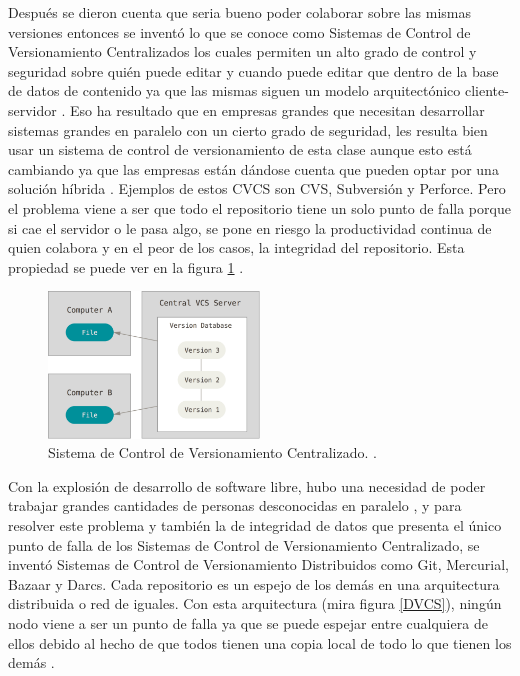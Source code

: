 Después se dieron cuenta que seria bueno poder colaborar sobre las mismas versiones entonces se inventó lo que se conoce como Sistemas de Control de Versionamiento Centralizados los cuales permiten un alto grado de control y seguridad sobre quién puede editar y cuando puede editar que dentro de la base de datos de contenido ya que las mismas siguen un modelo arquitectónico cliente-servidor \citep{PROGIT-Git-VCS}. Eso ha resultado que en empresas grandes que necesitan desarrollar sistemas grandes en paralelo con un cierto grado de seguridad, les resulta bien usar un sistema de control de versionamiento de esta clase aunque esto está cambiando ya que las empresas están dándose cuenta que pueden optar por una solución híbrida \citep{CollabNet-Dist-or-Cent}. Ejemplos de estos CVCS son CVS, Subversión y Perforce. Pero el problema viene a ser que todo el repositorio tiene un solo punto de falla porque si cae el servidor o le pasa algo, se pone en riesgo la productividad continua de quien colabora y en el peor de los casos, la integridad del repositorio. Esta propiedad se puede ver en la figura \ref{CVCS} \citep{PROGIT-Git-VCS}.

\begin{figure}
  \begin{center}
  	\includegraphics[width=0.5\textwidth]{Figures/cvcs.png}
  \end{center}
  \caption{Sistema de Control de Versionamiento Centralizado. \citep{PROGIT-Git-VCS}.}
  \label{CVCS}
\end{figure}

Con la explosión de desarrollo de software libre, hubo una necesidad de poder trabajar grandes cantidades de personas desconocidas en paralelo \citep{raymond1999cathedral}, y para resolver este problema y también la de integridad de datos que presenta el único punto de falla de los Sistemas de Control de Versionamiento Centralizado, se inventó Sistemas de Control de Versionamiento Distribuidos como Git, Mercurial, Bazaar y Darcs. Cada repositorio es un espejo de los demás en una arquitectura distribuida o red de iguales. Con esta arquitectura (mira figura \ref{DVCS}), ningún nodo viene a ser un punto de falla ya que se puede espejar entre cualquiera de ellos debido al hecho de que todos tienen una copia local de todo lo que tienen los demás \citep{PROGIT-Git-VCS}. 

